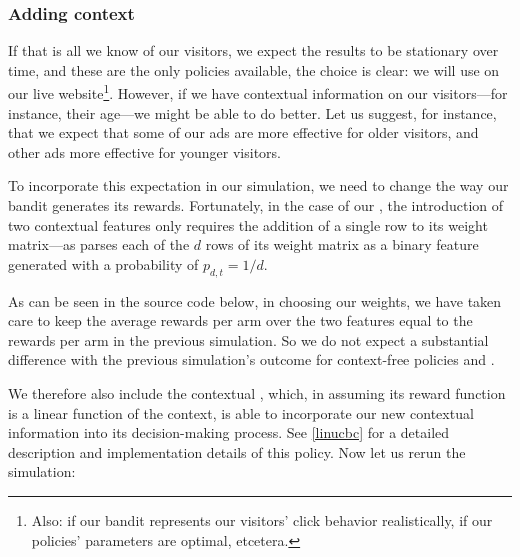 \documentclass{jss}
\begin{document}
\subsubsection{Adding context}

If that is all we know of our visitors, we expect the results to be stationary over time, and these are the only policies available, the choice is clear: we will use  on our live website\footnote{Also: if our bandit represents our visitors' click behavior realistically, if our policies' parameters are optimal, etcetera.}. However, if we have contextual information on our visitors---for instance, their age---we might be able to do better. Let us suggest, for instance, that we expect that some of our ads are more effective for older visitors, and other ads more effective for younger visitors.

To incorporate this expectation in our simulation, we need to change the way our bandit generates its rewards. Fortunately, in the case of our , the introduction of two contextual features only requires the addition of a single row to its weight matrix---as  parses each of the $d$ rows of its weight matrix as a binary feature generated with a probability of $p_{d,t} = 1/d$.

As can be seen in the source code below, in choosing our weights, we have taken care to keep the average rewards per arm over the two features equal to the rewards per arm in the previous simulation. So we do not expect a substantial difference with the previous simulation's outcome for context-free policies  and .

We therefore also include the contextual  \citep{Li2010}, which, in assuming its reward function is a linear function of the context, is able to incorporate our new contextual information into its decision-making process. See \ref{linucbc} for a detailed description and implementation details of this policy. Now let us rerun the simulation:
\end{document}
